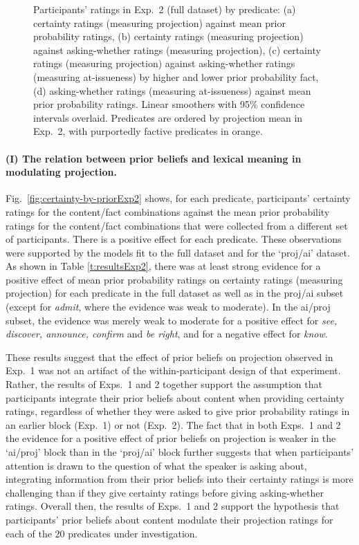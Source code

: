 \documentclass[11pt,fleqn]{article}
\newcommand{\6}{\mbox{$[\hspace*{-.6mm}[$}}
\newcommand{\9}{\mbox{$]\hspace*{-.6mm}]$}}
\begin{document}
\begin{figure}[h!]
\caption{Participants' ratings in Exp.~2 (full dataset) by predicate: (a) certainty ratings (measuring projection) against mean prior probability ratings, (b) certainty ratings (measuring projection) against asking-whether ratings (measuring projection), (c) certainty ratings (measuring projection) against asking-whether ratings (measuring at-issueness) by higher and lower prior probability fact, (d) asking-whether ratings (measuring at-issueness) against mean prior probability ratings. Linear smoothers with 95\% confidence intervals overlaid. Predicates are ordered by projection mean in Exp.~2, with purportedly factive predicates in orange.}\label{fig:results2}
\end{figure}

\paragraph{(I) The relation between prior beliefs and lexical meaning in modulating projection.}  Fig.~\ref{fig:certainty-by-priorExp2} shows, for each predicate, participants' certainty ratings for the content/fact combinations against the mean prior probability ratings for the content/fact combinations that were collected from a different set of participants. There is a positive effect for each predicate. These observations were supported by the models fit to the full dataset and for the `proj/ai' dataset. As shown in Table \ref{t:resultsExp2}, there was at least strong evidence for a positive effect of mean prior probability ratings on certainty ratings (measuring projection) for each predicate in the full dataset as well as in the proj/ai subset (except for {\em admit}, where the evidence was weak to moderate). In the ai/proj subset, the evidence was merely weak to moderate for a positive effect for {\em see, discover, announce, confirm} and {\em be right}, and for a negative effect for {\em know}. 

 These results suggest that the effect of prior beliefs on projection observed in Exp.~1 was not an artifact of the within-participant design of that experiment. Rather, the results of Exps.~1 and 2 together support the assumption that participants integrate their prior beliefs about content when providing certainty ratings, regardless of whether they were asked to give prior probability ratings in an earlier block (Exp.~1) or not (Exp.~2). The fact that in both Exps.~1 and 2 the evidence for a positive effect of prior beliefs on projection is weaker in the `ai/proj' block than in the `proj/ai' block further suggests that when participants' attention is drawn to the question of what the speaker is asking about, integrating information from their prior beliefs into their certainty ratings is more challenging than if they give certainty ratings before giving asking-whether ratings. Overall then, the results of Exps.~1 and 2 support the hypothesis that participants' prior beliefs about content modulate their projection ratings for each of the 20 predicates under investigation.
                          
\end{document}
